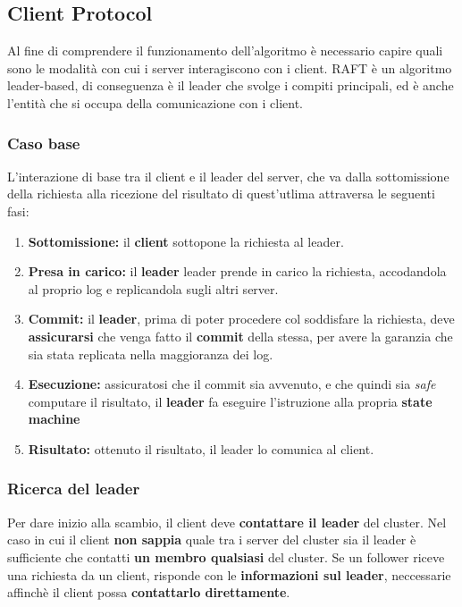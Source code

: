 \subsection{Client Protocol}

Al fine di comprendere il funzionamento dell'algoritmo è necessario capire quali sono le modalità con cui i server interagiscono con i client.
RAFT è un algoritmo leader-based, di conseguenza è il leader che svolge i compiti principali, ed è anche l'entità che si occupa della comunicazione con i client.

	\subsubsection{Caso base}
	L'interazione di base tra il client e il leader del server, che va dalla sottomissione della richiesta alla ricezione del risultato di quest'utlima attraversa le seguenti fasi:

	\begin{enumerate}
		\item{\textbf{Sottomissione:}} il \textbf{client} sottopone la richiesta al leader.

		\item{\textbf{Presa in carico:}} il \textbf{leader} leader prende in carico la richiesta, accodandola al proprio log e replicandola sugli altri server.

		\item{\textbf{Commit:}} il \textbf{leader}, prima di poter procedere col soddisfare la richiesta, deve \textbf{assicurarsi} che venga fatto il \textbf{commit} della stessa, per avere la garanzia che sia stata replicata nella maggioranza dei log. 

		\item{\textbf{Esecuzione:}} assicuratosi che il commit sia avvenuto, e che quindi sia \textit{safe} computare il risultato, il \textbf{leader} fa eseguire l'istruzione alla propria \textbf{state machine}

		\item{\textbf{Risultato:}} ottenuto il risultato, il leader lo comunica al client.

	\end{enumerate}

	
	\subsubsection{Ricerca del leader}
	Per dare inizio alla scambio, il client deve \textbf{contattare il leader} del cluster. Nel caso in cui il client \textbf{non sappia} quale tra i server del cluster sia il leader è sufficiente che contatti \textbf{un membro qualsiasi} del cluster.
	Se un follower riceve una richiesta da un client, risponde con le \textbf{informazioni sul leader}, neccessarie affinchè il client possa \textbf{contattarlo direttamente}. 

